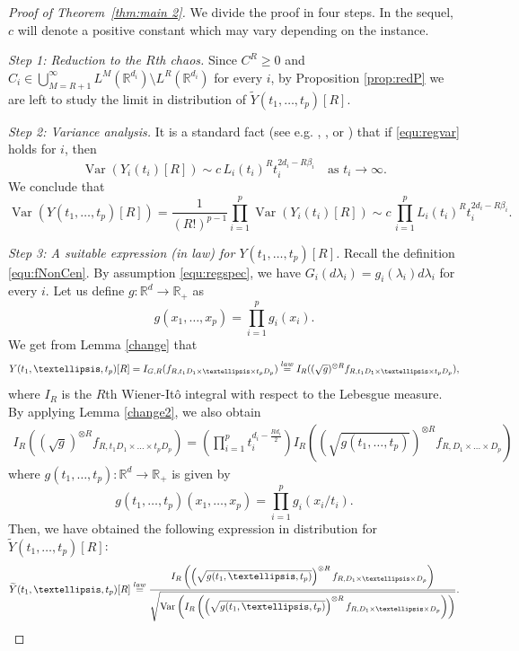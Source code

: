 \documentclass[12pt]{article}
\DeclareMathOperator{\var}{Var}
\DeclareMathOperator{\1}{1}
\newcommand{\R}{\mathbb{R}}
\renewcommand{\L}{ L}
\theoremstyle{plain}
\theoremstyle{definition}
\begin{document}
\begin{proof}[Proof of Theorem~\ref{thm:main 2}] We divide the proof in four steps. In the sequel, $c$ will denote a positive constant which may vary depending on the instance.

 \bigskip
 
 {\it Step 1: Reduction to the $R$th chaos.}
 Since  $C^R\geq 0$ and $C_i\in \bigcup_{M=R+1}^{\infty}\L^M(\R^{d_i})\setminus \L^R(\R^{d_i})$ for every $i$, by Proposition \ref{prop:redP} we are left to study the limit in distribution of $\widetilde Y(t_1,\dots,t_p)[R]$.
 
 \bigskip
 
 {\it Step 2: Variance analysis.}
     It is a standard fact (see e.g. \cite{LO13}, \cite{LO14}, \cite{L99} or \cite{M23}) that if \eqref{equ:regvar} holds for $i$, then 
     \[
     \var(Y_i(t_i)[R])\sim c\, L_i(t_i)^R t_i^{2d_i-R\beta_i}\quad \text{as }t_i\rightarrow\infty.
     \]
     We conclude that
     \[
     \var(Y(t_1,\dots,t_p)[R])=\frac{1}{(R!)^{p-1}}\prod_{i=1}^p\var(Y_i(t_i)[R])\sim c\, \prod_{i=1}^p L_i(t_i)^R t_i^{2d_i-R\beta_i}.
     \]
    
 \bigskip
 
 {\it Step 3: A suitable expression (in law) for $Y(t_1,\dots,t_p)[R]$.} Recall the definition \eqref{equ:fNonCen}. By assumption \eqref{equ:regspec}, we have $G_i(d\lambda_i)=g_i(\lambda_i)d\lambda_i$ for every $i$. Let us define $g:\R^d\rightarrow\R_+$ as
     \[
     g(x_1,\dots,x_p)=\prod_{i=1}^p g_i(x_i).
     \] 
     We get from Lemma \ref{change} that 
     \[
     Y(t_1,\dots,t_p)[R]=I_{G,R}(f_{R,t_1D_1\times\dots\times t_pD_p})\overset{\rm law}{=}I_{R}((\sqrt{g})^{\otimes R}f_{R,t_1D_1\times \dots\times t_pD_p}),
     \]
     where $I_R$ is the $R$th Wiener-It\^o integral with respect to the Lebesgue measure.
     By applying Lemma \ref{change2}, we also obtain 
     \begin{align}
         I_{R}((\sqrt{g})^{\otimes R}f_{R,t_1D_1\times \dots\times t_pD_p}) =\left(\prod_{i=1}^p t_i^{d_i-\frac{Rd_i}{2}}\right)I_{R}\left(\left(\sqrt{g(t_1,\dots,t_p)}\right)^{\otimes R}f_{R,D_1\times \dots\times D_p}\right)
     \end{align}
     where $g(t_1,\dots,t_p):\R^d\to \R_+$ is given by
     \[
     g(t_1,\dots,t_p)(x_1,\dots,x_p)=\prod_{i=1}^p g_i(x_i/t_i).
     \]
    Then, we have obtained the following expression in distribution for $\widetilde Y(t_1,\ldots,t_p)[R]$: \begin{equation}
        \widetilde Y(t_1,\dots,t_p)[R]\overset{\rm law}{=}\frac{I_{R}\left(\left(\sqrt{g(t_1,\dots,t_p)}\right)^{\otimes R}f_{R,D_1\times \dots\times D_p}\right)}{\sqrt{\var\left(I_{R}\left(\left(\sqrt{g(t_1,\dots,t_p)}\right)^{\otimes R}f_{R,D_1\times \dots\times D_p}\right)\right)}}.
    \end{equation}
     


\end{proof}
\end{document}
